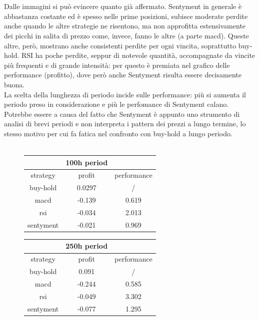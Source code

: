 \documentclass[a4paper,12pt]{report}
\begin{document}
\begin{fig}
\\~\\Dalle immagini si può evincere quanto già affermato. Sentyment in generale è abbastanza costante ed è spesso nelle prime posizioni, subisce moderate perdite anche quando le altre strategie ne risentono, ma non approfitta estensivamente dei picchi in salita di prezzo come, invece, fanno le altre (a parte macd). Queste altre, però, mostrano anche consistenti perdite per ogni vincita, soprattutto buy-hold. RSI ha poche perdite, seppur di notevole quantità, accompagnate da vincite più frequenti e di grande intensità: per questo è premiata nel grafico delle performance (profitto), dove però anche Sentyment risulta essere decisamente buona.\\ La scelta della lunghezza di periodo incide sulle performance: più si aumenta il periodo preso in considerazione e più le perfomance di Sentyment calano. Potrebbe essere a causa del fatto che Sentyment è appunto uno strumento di analisi di brevi periodi e non interpreta i pattern dei prezzi a lungo termine, lo stesso motivo per cui fa fatica nel confronto con buy-hold a lungo periodo.\\~\\
\begin{fig}
	\begin{subfigure}{\linewidth}
		\begin{tabular}{||c c c||}
			\hline\hline
			& \textbf{100h period} & \\
			\hline\hline
			strategy & profit & performance \\ [0.5ex] 
			\hline\hline
			buy-hold & 0.0297 & / \\
			\hline
			macd & -0.139 & 0.619 \\
			\hline
			rsi & -0.034 & 2.013 \\
			\hline
			sentyment & -0.021 & 0.969 \\ [1ex]
			\hline\hline
		\end{tabular}
		\begin{tabular}{||c c c ||} 
			\hline\hline
			& \textbf{250h period} & \\
			\hline\hline
			strategy & profit & performance \\ [0.5ex] 
			\hline\hline
			buy-hold & 0.091 & / \\
			\hline
			macd & -0.244 & 0.585 \\
			\hline
			rsi & -0.049 & 3.302 \\
			\hline
			sentyment & -0.077 & 1.295 \\ [1ex]
			\hline\hline
		\end{tabular}
	\end{subfigure}
	\label{Tabella 4}
\end{fig}


\end{fig}
\end{document}
